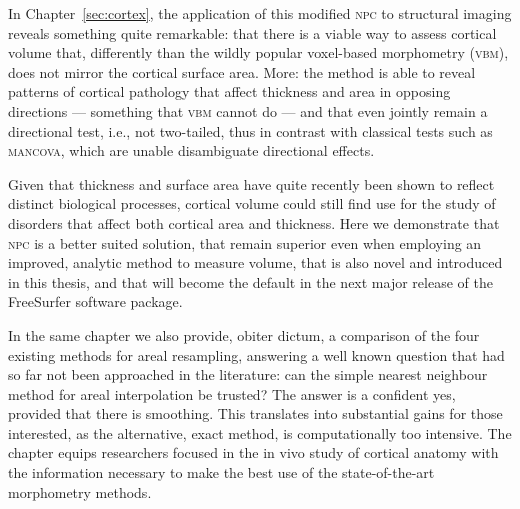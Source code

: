 In Chapter~\ref{sec:cortex}, the application of this modified \textsc{npc} to structural imaging reveals something quite remarkable: that there is a viable way to assess cortical volume that, differently than the wildly popular voxel-based morphometry (\textsc{vbm}), does not mirror the cortical surface area. More: the method is able to reveal patterns of cortical pathology that affect thickness and area in opposing directions --- something that \textsc{vbm} cannot do --- and that even jointly remain a directional test, i.e., not two-tailed, thus in contrast with classical tests such as \textsc{mancova}, which are unable disambiguate directional effects.

Given that thickness and surface area have quite recently been shown to reflect distinct biological processes, cortical volume could still find use for the study of disorders that affect both cortical area and thickness. Here we demonstrate that \textsc{npc} is a better suited solution, that remain superior even when employing an improved, analytic method to measure volume, that is also novel and introduced in this thesis, and that will become the default in the next major release of the FreeSurfer software package.

In the same chapter we also provide, obiter dictum, a comparison of the four existing methods for areal resampling, answering a well known question that had so far not been approached in the literature: can the simple nearest neighbour method for areal interpolation be trusted? The answer is a confident yes, provided that there is smoothing. This translates into substantial gains for those interested, as the alternative, exact method, is computationally too intensive. The chapter equips researchers focused in the in vivo study of cortical anatomy with the information necessary to make the best use of the state-of-the-art morphometry methods.